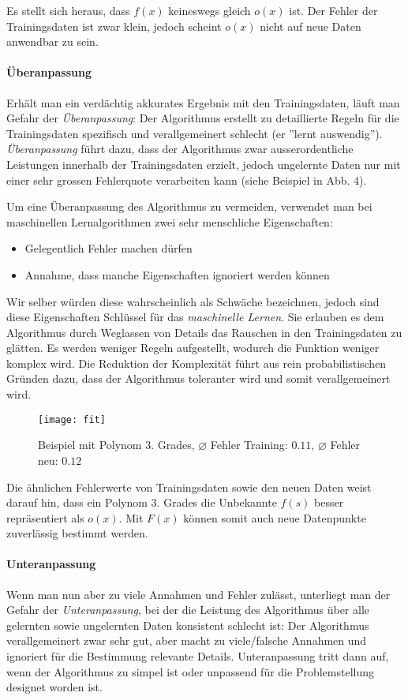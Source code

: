 Es stellt sich heraus, dass $f(x)$ keineswegs gleich $o(x)$ ist. Der Fehler der Trainingsdaten ist zwar klein, jedoch scheint $o(x)$ nicht auf neue Daten anwendbar zu sein.

\paragraph{Überanpassung} Erhält man ein verdächtig akkurates Ergebnis mit den Trainingsdaten, läuft man Gefahr der \textit{Überanpassung}: Der Algorithmus erstellt zu detaillierte Regeln für die Trainingsdaten spezifisch und verallgemeinert schlecht (er ''lernt auswendig''). \textit{Überanpassung} führt dazu, dass der Algorithmus zwar ausserordentliche Leistungen innerhalb der Trainingsdaten erzielt, jedoch ungelernte Daten nur mit einer sehr grossen Fehlerquote verarbeiten kann (siehe Beispiel in Abb. 4).

Um eine Überanpassung des Algorithmus zu vermeiden, verwendet man bei maschinellen Lernalgorithmen zwei sehr menschliche Eigenschaften:
\begin{itemize}[leftmargin=2cm]
	\item Gelegentlich Fehler machen dürfen
	\item Annahme, dass manche Eigenschaften ignoriert werden können
\end{itemize}
Wir selber würden diese wahrscheinlich als Schwäche bezeichnen, jedoch sind diese Eigenschaften Schlüssel für das \textit{maschinelle Lernen}. Sie erlauben es dem Algorithmus durch Weglassen von Details das Rauschen in den Trainingsdaten zu glätten. Es werden weniger Regeln aufgestellt, wodurch die Funktion weniger komplex wird. Die Reduktion der Komplexität führt aus rein probabilistischen Gründen dazu, dass der Algorithmus toleranter wird und somit verallgemeinert wird\cite{welch_prob}.

\begin{figure}[h]
	\centering
	\texttt{[image: fit]}
	\caption[Beispiel mit Polynom 3. Grades]{Beispiel mit Polynom 3. Grades, $\diameter$ Fehler Training: $0.11$, $\diameter$ Fehler neu: $0.12$}
\end{figure}

Die ähnlichen Fehlerwerte von Trainingsdaten sowie den neuen Daten weist darauf hin, dass ein Polynom 3. Grades die Unbekannte $f(s)$ besser repräsentiert als $o(x)$. Mit $F(x)$ können somit auch neue Datenpunkte zuverlässig bestimmt werden.

\paragraph{Unteranpassung} Wenn man nun aber zu viele Annahmen und Fehler zulässt, unterliegt man der Gefahr der \textit{Unteranpassung}, bei der die Leistung des Algorithmus über alle gelernten sowie ungelernten Daten konsistent schlecht ist: Der Algorithmus verallgemeinert zwar sehr gut, aber macht zu viele/falsche Annahmen und ignoriert für die Bestimmung relevante Details. Unteranpassung tritt dann auf, wenn der Algorithmus zu simpel ist oder unpassend für die Problemstellung designet worden ist.\\

